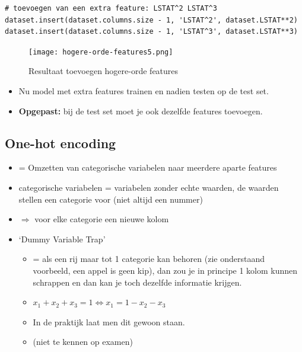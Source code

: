 \documentclass{article}
\begin{document}
\begin{figure}[H]
    \centering
\end{figure}

\begin{verbatim}
# toevoegen van een extra feature: LSTAT^2 LSTAT^3
dataset.insert(dataset.columns.size - 1, 'LSTAT^2', dataset.LSTAT**2)
dataset.insert(dataset.columns.size - 1, 'LSTAT^3', dataset.LSTAT**3)
\end{verbatim}

\begin{figure}[H]
    \centering
    \texttt{[image: hogere-orde-features5.png]}
    \caption{Resultaat toevoegen hogere-orde features}
\end{figure}

\begin{itemize}
    \item Nu model met extra features trainen en nadien testen op de test set.
    \item \textbf{Opgepast:} bij de test set moet je ook dezelfde features toevoegen.
\end{itemize}

\subsection{One-hot encoding}

\begin{itemize}
    \item = Omzetten van categorische variabelen naar meerdere aparte features
    \item categorische variabelen = variabelen zonder echte waarden, de waarden stellen een categorie voor (niet altijd een nummer)
    \item $\Rightarrow$ voor elke categorie een nieuwe kolom
    \item `Dummy Variable Trap'
    \begin{itemize}
        \item = als een rij maar tot 1 categorie kan behoren (zie onderstaand voorbeeld, een appel is geen kip), dan zou je in principe 1 kolom kunnen schrappen en dan kan je toch dezelfde informatie krijgen.
        \item $x_1 + x_2 + x_3 = 1 \Leftrightarrow x_1 = 1 - x_2 - x_3$   
        \item In de praktijk laat men dit gewoon staan.
        \item (niet te kennen op examen)
    \end{itemize}
\end{itemize}
\end{document}
